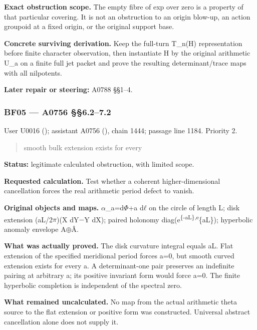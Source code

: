 \textbf{Exact obstruction scope.} The empty fibre of exp over zero is a
property of that particular covering. It is not an obstruction to an
origin blow-up, an action groupoid at a fixed origin, or the original
support base.

\textbf{Concrete surviving derivation.} Keep the full-turn T\_n(H)
representation before finite character observation, then instantiate H
by the original arithmetic U\_a on a finite full jet packet and prove
the resulting determinant/trace maps with all nilpotents.

\textbf{Later repair or steering:} A0788 §§1--4.

\subsubsection{BF05 --- A0756 §§6.2--7.2}\label{TranscriptLedgerStage:bf05-a0756-6.27.2}

User U0016 (\protect{});
assistant A0756 (\protect{}),
chain 1444; passage line 1184. Priority 2.

\begin{quote}
smooth bulk extension exists for every
\end{quote}

\textbf{Status:} legitimate calculated obstruction, with limited scope.

\textbf{Requested calculation.} Test whether a coherent
higher-dimensional cancellation forces the real arithmetic period defect
to vanish.

\textbf{Original objects and maps.}
\allowbreak{}\ensuremath{α}\allowbreak{}\_a=d\allowbreak{}\ensuremath{Φ}\allowbreak{}+a
d\allowbreak{}\ensuremath{ℓ}\allowbreak{} on the circle of length L;
disk extension (aL/2\allowbreak{}\ensuremath{π}\allowbreak{})(X
dY\allowbreak{}\ensuremath{−}\allowbreak{}Y dX); paired holonomy
diag(e\textsuperscript{\{-aL\},e}\{aL\}); hyperbolic anomaly envelope
A\allowbreak{}\ensuremath{⊕}\allowbreak{}Â.

\textbf{What was actually proved.} The disk curvature integral equals
aL. Flat extension of the specified meridional period forces a=0, but
smooth curved extension exists for every a. A determinant-one pair
preserves an indefinite pairing at arbitrary a; its positive invariant
form would force a=0. The finite hyperbolic completion is independent of
the spectral zero.

\textbf{What remained uncalculated.} No map from the actual arithmetic
theta source to the flat extension or positive form was constructed.
Universal abstract cancellation alone does not supply it.

